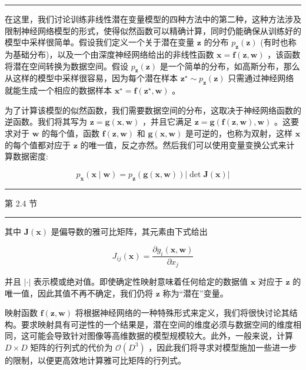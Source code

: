 \documentclass[10pt]{report}
\newcommand{\HRule}{\begin{center}\rule{0.9\linewidth}{0.2mm}\end{center}}
\begin{document}
\HRule

在这里，我们讨论训练非线性潜在变量模型的四种方法中的第二种，这种方法涉及限制神经网络模型的形式，使得似然函数可以精确计算，同时仍能确保从训练好的模型中采样很简单。假设我们定义一个关于潜在变量 \(\mathbf{z}\) 的分布 \({p}_{\mathbf{z}}\left( \mathbf{z}\right)\) (有时也称为基础分布)，以及一个由深度神经网络给出的非线性函数 \(\mathbf{x} = \mathbf{f}\left( {\mathbf{z},\mathbf{w}}\right)\) ，该函数将潜在空间转换为数据空间。假设 \({p}_{\mathbf{z}}\left( \mathbf{z}\right)\) 是一个简单的分布，如高斯分布，那么从这样的模型中采样很容易，因为每个潜在样本 \({\mathbf{z}}^{ \star  } \sim  {p}_{\mathbf{z}}\left( \mathbf{z}\right)\) 只需通过神经网络就能生成一个相应的数据样本 \({\mathbf{x}}^{ \star  } = \mathbf{f}\left( {{\mathbf{z}}^{ \star  },\mathbf{w}}\right)\) 。

为了计算该模型的似然函数，我们需要数据空间的分布，这取决于神经网络函数的逆函数。我们将其写为 \(\mathbf{z} = \mathbf{g}\left( {\mathbf{x},\mathbf{w}}\right)\) ，并且它满足 \(\mathbf{z} = \mathbf{g}\left( {\mathbf{f}\left( {\mathbf{z},\mathbf{w}}\right) ,\mathbf{w}}\right)\) 。这要求对于 \(\mathbf{w}\) 的每个值，函数 \(\mathbf{f}\left( {\mathbf{z},\mathbf{w}}\right)\) 和 \(\mathbf{g}\left( {\mathbf{x},\mathbf{w}}\right)\) 是可逆的，也称为双射，这样 \(\mathbf{x}\) 的每个值都对应于 \(\mathbf{z}\) 的唯一值，反之亦然。然后我们可以使用变量变换公式来计算数据密度:

\[
{p}_{\mathbf{x}}\left( {\mathbf{x} \mid  \mathbf{w}}\right)  = {p}_{\mathbf{z}}\left( {\mathbf{g}\left( {\mathbf{x},\mathbf{w}}\right) }\right) \left| {\det \mathbf{J}\left( \mathbf{x}\right) }\right|  \tag{18.1}
\]

\HRule

第 2.4 节

\HRule

其中 \(\mathbf{J}\left( \mathbf{x}\right)\) 是偏导数的雅可比矩阵，其元素由下式给出

\[
{J}_{ij}\left( \mathbf{x}\right)  = \frac{\partial {g}_{i}\left( {\mathbf{x},\mathbf{w}}\right) }{\partial {x}_{j}} \tag{18.2}
\]

并且 \(\left| \cdot \right|\) 表示模或绝对值。即使确定性映射意味着任何给定的数据值 \(\mathbf{x}\) 对应于 \(\mathbf{z}\) 的唯一值，因此其值不再不确定，我们仍将 \(\mathbf{z}\) 称为“潜在”变量。

映射函数 \(\mathbf{f}\left( {\mathbf{z},\mathbf{w}}\right)\) 将根据神经网络的一种特殊形式来定义，我们将很快讨论其结构。要求映射具有可逆性的一个结果是，潜在空间的维度必须与数据空间的维度相同，这可能会导致针对图像等高维数据的模型规模较大。此外，一般来说，计算 \(D \times  D\) 矩阵的行列式的代价为 \(\mathcal{O}\left( {D}^{3}\right)\) ，因此我们将寻求对模型施加一些进一步的限制，以便更高效地计算雅可比矩阵的行列式。
\end{document}
